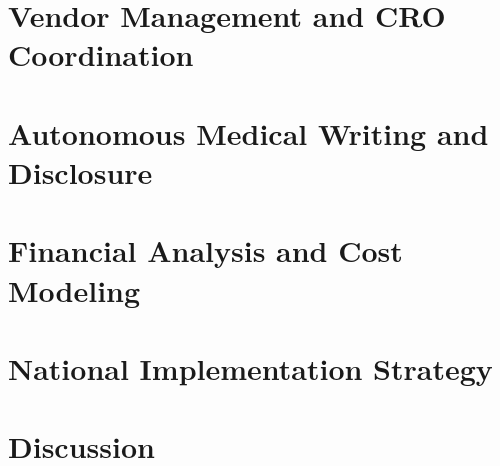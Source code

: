 \documentclass{article}
\begin{document}
\section{Vendor Management and CRO Coordination}
\label{sec:vendor}

\newpage

\section{Autonomous Medical Writing and Disclosure}
\label{sec:writing}

\newpage

\section{Financial Analysis and Cost Modeling}
\label{sec:financial}

\newpage

\section{National Implementation Strategy}
\label{sec:implementation}

\newpage

\section{Discussion}
\label{sec:discussion}

\newpage

\end{document}
